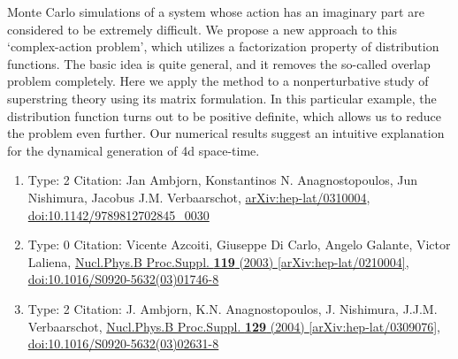 \documentclass[a4paper,10pt]{article}
\begin{document}
\begin{enumerate}
Monte Carlo simulations of a system whose action has an imaginary part are considered to be extremely difficult. We propose a new approach to this `complex-action problem', which utilizes a factorization property of distribution functions. The basic idea is quite general, and it removes the so-called overlap problem completely. Here we apply the method to a nonperturbative study of superstring theory using its matrix formulation. In this particular example, the distribution function turns out to be positive definite, which allows us to reduce the problem even further. Our numerical results suggest an intuitive explanation for the dynamical generation of 4d space-time.
\begin{enumerate}
  \item Type: 2 Citation: Jan Ambjorn, Konstantinos N. Anagnostopoulos, Jun Nishimura, Jacobus J.M. Verbaarschot, \href{https://arxiv.org/abs/hep-lat/0310004}{arXiv:hep-lat/0310004},\\\href{https://www.doi.org/10.1142/9789812702845_0030}{doi:10.1142/9789812702845\_0030}
  \item Type: 0 Citation: Vicente Azcoiti, Giuseppe Di Carlo, Angelo Galante, Victor Laliena, \href{https://www.doi.org/10.1016/S0920-5632(03)01746-8}{Nucl.Phys.B Proc.Suppl. {\bf 119} (2003) }  \href{https://arxiv.org/abs/hep-lat/0210004}{[arXiv:hep-lat/0210004]},\\\href{https://www.doi.org/10.1016/S0920-5632(03)01746-8}{doi:10.1016/S0920-5632(03)01746-8}
  \item Type: 2 Citation: J. Ambjorn, K.N. Anagnostopoulos, J. Nishimura, J.J.M. Verbaarschot, \href{https://www.doi.org/10.1016/S0920-5632(03)02631-8}{Nucl.Phys.B Proc.Suppl. {\bf 129} (2004) }  \href{https://arxiv.org/abs/hep-lat/0309076}{[arXiv:hep-lat/0309076]},\\\href{https://www.doi.org/10.1016/S0920-5632(03)02631-8}{doi:10.1016/S0920-5632(03)02631-8}

\end{enumerate}
\end{enumerate}
\end{document}
